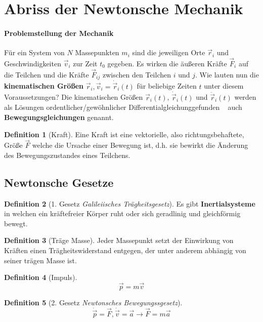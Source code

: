 \documentclass[oneside]{book}
\theoremstyle{definition}
\newtheorem*{definition*}{Definition}
\newcommand{\Dgl}{Differentialgleichung}
\newcommand{\dotvec}[1]{\dot{\vec{#1}}}
\newcommand{\ddotvec}[1]{\ddot{\vec{#1}}}
\begin{document}
\section{Abriss der Newtonsche Mechanik}
\paragraph{Problemstellung der Mechanik}
Für ein System von $N$ Massepunkten $m_i$ sind die jeweiligen Orte $\vec{r}_i$ und Geschwindigkeiten $\vec{v}_i$ zur Zeit $t_0$ gegeben. Es wirken die äußeren Kräfte $\vec{F}_i$ auf die Teilchen und die Kräfte $\vec{F}_{ij}$ zwischen den Teilchen $i$ und $j$. Wie lauten nun die \textbf{kinematischen Größen} $\vec{r}_i, \vec{v}_i = \dotvec{r}_i(t)$  für beliebige Zeiten $t$ unter diesem Voraussetzungen? Die kinematischen Größen $\vec{r}_i(t)$, $\dotvec{r}_i(t)$ und $\ddotvec{r}_i(t)$ werden als Lösungen ordentlicher/gewöhnlicher \Dgl gefunden \textendash~ auch  \textbf{Bewegungsgleichungen} genannt.\\

\begin{definition*}[Kraft]
Eine Kraft ist eine vektorielle, also richtungsbehaftete, Größe $\vec{F}$ welche die Ursache einer Bewegung ist, d.h. sie bewirkt die Änderung des Bewegungszustandes eines Teilchens.
\end{definition*}

\subsection{Newtonsche Gesetze}
\begin{definition*}[1. Gesetz \textit{Galileiisches Trägheitsgesetz}] 
Es gibt \textbf{Inertialsysteme} in welchen ein kräftefreier Körper ruht oder sich geradlinig und gleichförmig bewegt.
\end{definition*}

\begin{definition*}[Träge Masse]
	Jeder Massepunkt setzt der Einwirkung von Kräften einen Trägheitswiderstand entgegen, der unter anderem abhängig von seiner trägen Masse ist.
\end{definition*}

\begin{definition*}[Impuls]
	\begin{equation*}
		\vec{p} = m \vec{v}
	\end{equation*}
\end{definition*}

\begin{definition*}[2. Gesetz \textit{Newtonsches Bewegungssgesetz}]
\begin{equation*}
	\dot{\vec{p}} = \vec{F}, \dot{\vec{v}} = \vec{a} \rightarrow \vec{F} = m \vec{a}
\end{equation*}
\end{definition*}
\end{document}
